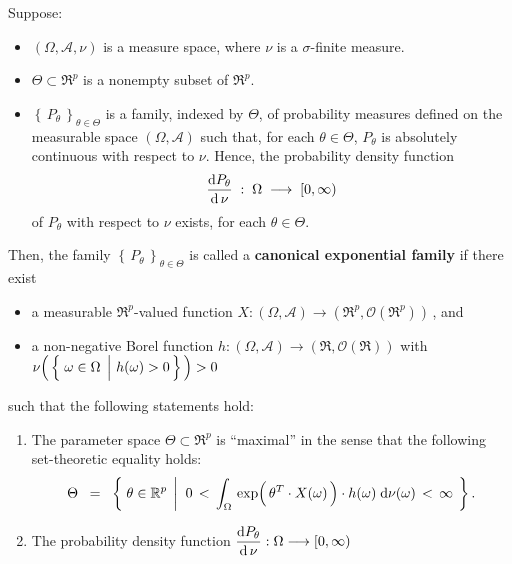 \begin{definition}
\mbox{}\vskip 0.1cm
\noindent
Suppose:
\begin{itemize}
\item
	$(\Omega,\mathcal{A},\nu)$ is a measure space, where $\nu$ is a $\sigma$-finite measure.
\item
	$\Theta \subset \Re^{p}$ is a nonempty subset of $\Re^{p}$.
\item
	$\left\{\,P_{\theta}\,\right\}_{\theta \in \Theta}$ is a family, indexed by $\Theta$,
	of probability measures defined on the measurable space $(\Omega,\mathcal{A})$ such that,
	for each $\theta \in \Theta$, $P_{\theta}$ is absolutely continuous with respect to $\nu$.
	Hence, the probability density function
	\begin{equation*}
	\dfrac{\textnormal{d} P_{\theta}}{\textnormal{d}\,\nu} \; : \; \Omega \; \longrightarrow \; [0,\infty)
	\end{equation*}
	of $P_{\theta}$ with respect to $\nu$ exists, for each $\theta \in \Theta$.
\end{itemize}
Then, the family $\left\{\,P_{\theta}\,\right\}_{\theta \in \Theta}$ is called a
\textbf{{\color{red}canonical} exponential family}
if there exist
\begin{itemize}
\item
	a measurable $\Re^{p}$-valued function $X : (\Omega,\mathcal{A}) \longrightarrow (\Re^{p},\mathcal{O}(\Re^{p}))$\,, and
\item
	a non-negative Borel function $h : (\Omega,\mathcal{A}) \longrightarrow (\Re,\mathcal{O}(\Re))$ with
	\,$\nu\!\left(\,\left\{\,\left.\omega\overset{{\color{white}.}}{\in}\Omega\,\;\right\vert\,h(\omega) > 0\,\right\}\,\right) > 0$
\end{itemize}
such that the following statements hold:
\begin{enumerate}
\item
	The parameter space $\Theta \subset \Re^{p}$ is ``maximal''
	in the sense that the following set-theoretic equality holds:
	\begin{equation*}
	\Theta
	\;\; = \;\;
		\left\{\;
			\theta \in \Re^{p}
			\;\left\vert\;\;
			0 \, < \,
			\int_{\Omega}\,
				\exp\!\left(\,\theta^{T} \!\overset{{\color{white}-}}{\cdot}\! X(\omega)\,\right) \cdot h(\omega)
			\;\d\nu(\omega)
			\, < \, \infty
			\right.
		\;\right\}.
	\end{equation*}	
\item
	The probability density function
	$\dfrac{\textnormal{d} P_{\theta}}{\textnormal{d}\,\nu} : \Omega \longrightarrow [0,\infty)$

\end{enumerate}
\end{definition}
